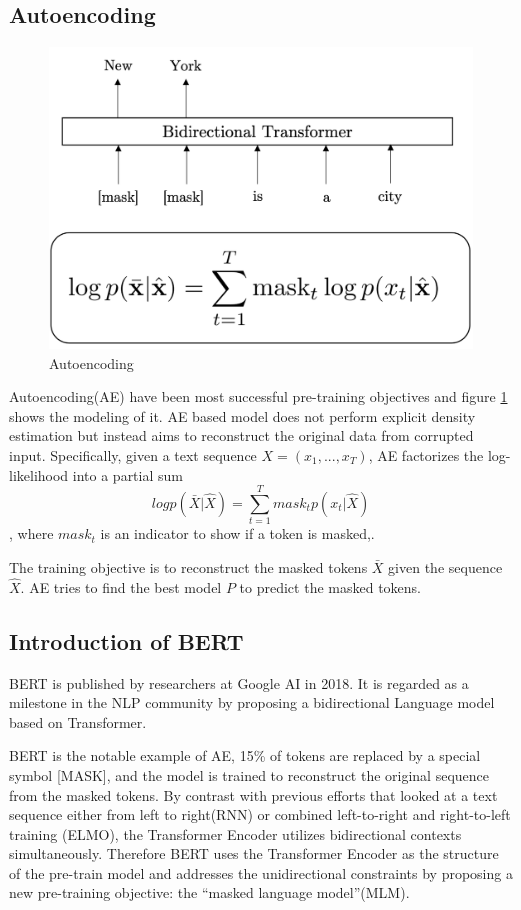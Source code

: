 \documentclass[]{krantz}
\begin{document}
\hypertarget{autoencoding}{%
\subsection{Autoencoding}\label{autoencoding}}

\begin{figure}

{\centering \includegraphics[width=0.5\linewidth]{figures/02-03-transfer-learning-for-nlp/autoencoding} 

}

\caption{Autoencoding}\label{fig:ch02-03-figure01}
\end{figure}

Autoencoding(AE) have been most successful pre-training objectives and figure \ref{fig:ch02-03-figure01} shows the modeling of it. AE based model does not perform explicit density estimation but instead aims to reconstruct the original data from corrupted input. Specifically, given a text sequence \(X = (x_1,...,x_T)\), AE factorizes the log-likelihood into a partial sum \[log p(\bar{X}|\hat{X}) = \sum^T_{t=1} mask_t p(x_t|\hat{X})\], where \(mask_t\) is an indicator to show if a token is masked,\citet{yang2019xlnet}.

The training objective is to reconstruct the masked tokens \(\bar{X}\) given the sequence \(\hat{X}\). AE tries to find the best model \(P\) to predict the masked tokens.

\hypertarget{introduction-of-bert}{%
\subsection{Introduction of BERT}\label{introduction-of-bert}}

BERT is published by researchers at Google AI in 2018. It is regarded as a milestone in the NLP community by proposing a bidirectional Language model based on Transformer.

BERT is the notable example of AE, 15\% of tokens are replaced by a special symbol {[}MASK{]}, and the model is trained to reconstruct the original sequence from the masked tokens. By contrast with previous efforts that looked at a text sequence either from left to right(RNN) or combined left-to-right and right-to-left training (ELMO), the Transformer Encoder utilizes bidirectional contexts simultaneously. Therefore BERT uses the Transformer Encoder as the structure of the pre-train model and addresses the unidirectional constraints by proposing a new pre-training objective: the ``masked language model''(MLM).
\end{document}
